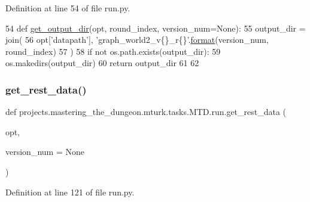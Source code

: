 Definition at line 54 of file run.\+py.


\begin{DoxyCode}
54 \textcolor{keyword}{def }\hyperlink{namespaceprojects_1_1mastering__the__dungeon_1_1mturk_1_1tasks_1_1MTD_1_1run_a7f8196f264013bc16be3e85fe5c68f0d}{get\_output\_dir}(opt, round\_index, version\_num=None):
55     output\_dir = join(
56         opt[\textcolor{stringliteral}{'datapath'}], \textcolor{stringliteral}{'graph\_world2\_v\{\}\_r\{\}'}.\hyperlink{namespaceparlai_1_1chat__service_1_1services_1_1messenger_1_1shared__utils_a32e2e2022b824fbaf80c747160b52a76}{format}(version\_num, round\_index)
57     )
58     \textcolor{keywordflow}{if} \textcolor{keywordflow}{not} os.path.exists(output\_dir):
59         os.makedirs(output\_dir)
60     \textcolor{keywordflow}{return} output\_dir
61 
62 
\end{DoxyCode}
\mbox{\label{namespaceprojects_1_1mastering__the__dungeon_1_1mturk_1_1tasks_1_1MTD_1_1run_ae9acbe1fe240a624b01fed3f073cc780}} 
\subsubsection{\texorpdfstring{get\+\_\+rest\+\_\+data()}{get\_rest\_data()}}
{\footnotesize\ttfamily def projects.\+mastering\+\_\+the\+\_\+dungeon.\+mturk.\+tasks.\+M\+T\+D.\+run.\+get\+\_\+rest\+\_\+data (\begin{DoxyParamCaption}\item[{}]{opt,  }\item[{}]{version\+\_\+num = {\ttfamily None} }\end{DoxyParamCaption})}



Definition at line 121 of file run.\+py.


